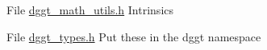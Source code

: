 
\begin{DoxyRefList}
\item[File \mbox{\hyperlink{dggt__math__utils_8h}{dggt\+\_\+math\+\_\+utils.h}} ]\label{todo__todo000001}%
%
Intrinsics  
\item[File \mbox{\hyperlink{dggt__types_8h}{dggt\+\_\+types.h}} ]\label{todo__todo000002}%
%
Put these in the dggt namespace 
\end{DoxyRefList}